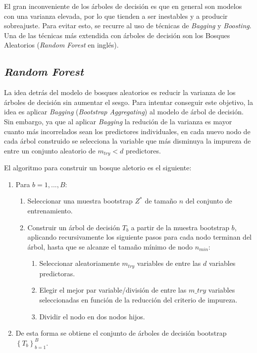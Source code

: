 \documentclass[12pt,a4paper,]{book}
\providecommand{\tightlist}{%
  \setlength{\itemsep}{0pt}\setlength{\parskip}{0pt}}
\numberwithin{dummy}{section}
\theoremstyle{ocrenumbox}
\theoremstyle{blacknumex}
\theoremstyle{blacknumbox}
\theoremstyle{ocrenum}
\theoremstyle{ocrenum}
\begin{document}
El gran inconveniente de los árboles de decisión es que en general son
modelos con una varianza elevada, por lo que tienden a ser inestables y
a producir sobreajuste. Para evitar esto, se recurre al uso de técnicas
de \emph{Bagging} y \emph{Boosting}. Una de las técnicas más extendida
con árboles de decisión son los Bosques Aleatorios (\emph{Random Forest}
en inglés).

\hypertarget{random-forest}{%
\subsection{\texorpdfstring{\emph{Random
Forest}}{Random Forest}}\label{random-forest}}

La idea detrás del modelo de bosques aleatorios es reducir la varianza
de los árboles de decisión sin aumentar el sesgo. Para intentar
conseguir este objetivo, la idea es aplicar \emph{Bagging}
(\emph{Bootstrap Aggregating}) al modelo de árbol de decisión. Sin
embargo, ya que al aplicar \emph{Bagging} la redución de la varianza es
mayor cuanto más incorrelados sean los predictores individuales, en cada
nuevo nodo de cada árbol construido se selecciona la variable que más
disminuya la impureza de entre un conjunto aleatorio de \(m_{try} < d\)
predictores.

El algoritmo para construir un bosque aletorio es el siguiente:

\begin{enumerate}
\def\labelenumi{\arabic{enumi}.}
\item
  Para \(b = {1,...,B}:\)

  \begin{enumerate}
  \def\labelenumii{\alph{enumii})}
  \item
    Seleccionar una muestra bootstrap \(Z^*\) de tamaño \(n\) del
    conjunto de entrenamiento.
  \item
    Construir un árbol de decisión \(T_b\) a partir de la muestra
    bootstrap \(b\), aplicando recursivamente los siguiente pasos para
    cada nodo terminan del árbol, hasta que se alcanze el tamaño mínimo
    de nodo \(n_{min}:\)

    \begin{enumerate}
    \def\labelenumiii{\roman{enumiii}.}
    \tightlist
    \item
      Seleccionar aleatoriamente \(m_{try}\) variables de entre las
      \(d\) variables predictoras.
    \item
      Elegir el mejor par variable/división de entre las \(m\_try\)
      variables seleccionadas en función de la reducción del criterio de
      impureza.
    \item
      Dividir el nodo en dos nodos hijos.
    \end{enumerate}
  \end{enumerate}
\item
  De esta forma se obtiene el conjunto de árboles de decisión bootstrap
  \(\left\{ T_b \right\}_{b=1}^B\).
\end{enumerate}
\end{document}
